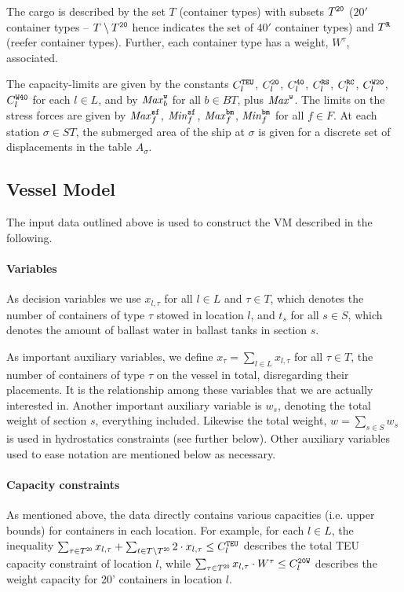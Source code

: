 The cargo is described by the set $T$ (container types) with subsets $T^{\texttt{20}}$ ($20'$ container types -- $T\setminus T^{\texttt{20}}$ hence indicates the set of $40'$ container types) and $T^{\texttt{R}}$ (reefer container types). 
Further, each container type has a weight, $W^\tau$, associated.

The capacity-limits are given by the constants $C^{\texttt{TEU}}_l$, $C^{\texttt{20}}_l$, $C^{\texttt{40}}_l$, $C^{\texttt{RS}}_l$, $C^{\texttt{RC}}_l$, $C^{\texttt{W20}}_l$, $C^{\texttt{W40}}_l$ for each $l\in L$, and by $\mathit{Max}^{\texttt{w}}_b$ for all $b\in BT$, plus $\mathit{Max}^{\texttt{w}}$. The limits on the stress forces are given by $\mathit{Max}^{\texttt{sf}}_f$, $\mathit{Min}^{\texttt{sf}}_f$, $\mathit{Max}^{\texttt{bm}}_f$, $\mathit{Min}^{\texttt{bm}}_f$ for all $f\in F$. At each station $\sigma\in ST$, the submerged area of the ship at $\sigma$ is given for a discrete set of displacements in the table $A_\sigma$.

\subsection*{Vessel Model}
The input data outlined above is used to construct the VM described in the following.

\paragraph{Variables}
As decision variables we use $x_{l,\tau}$ for all $l\in L$ and $\tau \in T$, which denotes the number of containers of type $\tau$ stowed in location $l$, and $t_s$ for all $s\in S$, which denotes the amount of ballast water in ballast tanks in section $s$. 

As important auxiliary variables, we define $x_\tau = \sum_{l\in L} x_{l,\tau}$ for all $\tau\in T$, the number of containers of type $\tau$ on the vessel in total, disregarding their placements. It is the relationship among these variables that we are actually interested in.  
Another important auxiliary variable is $w_s$, denoting the total weight of section $s$, everything included. Likewise the total weight, $w = \sum_{s\in S}w_s$ is used in hydrostatics constraints (see further below). 
Other auxiliary variables used to ease notation are mentioned below as necessary.

\paragraph{Capacity constraints}
As mentioned above, the data directly contains various capacities (i.e. upper bounds) for containers in each location. For example, for each $l\in L$, the inequality $\sum_{\tau \in T^{\texttt{20}}}x_{l,\tau} + \sum_{t\in T\setminus T^{\texttt{20}}}2\cdot x_{l,\tau}\leq C^{\texttt{TEU}}_l$  describes the total TEU capacity constraint of location $l$, while $\sum_{\tau \in T^{\texttt{20}}}x_{l,\tau}\cdot W^\tau\leq C^{\texttt{20W}}_l$ describes the weight capacity for 20' containers in location $l$.

